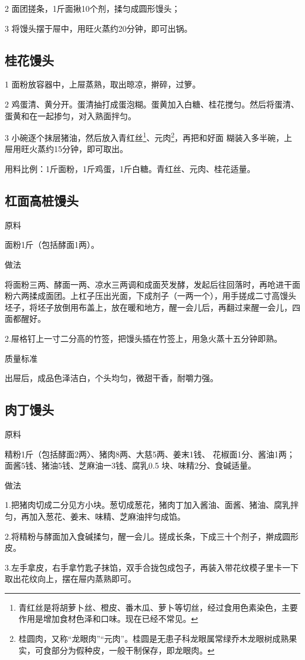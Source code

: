 \documentclass{ctexbook}
\begin{document}
2 面团搓条，1斤面揪10个剂，揉匀成圆形馒头；

3 将馒头摆于屉中，用旺火蒸约20分钟，即可出锅。
\subsection{桂花馒头}
1 面粉放容器中，上屉蒸熟，取出晾凉，擀碎，过箩。

2 鸡蛋清、黄分开。蛋清抽打成蛋泡糊。蛋黄加入白糖、桂花搅匀。然后将蛋清、蛋黄和在一起掺匀，对入熟面拌匀。

3 小碗逐个抹层猪油，然后放入青红丝\footnote{青红丝是将胡萝卜丝、橙皮、番木瓜、萝卜等切丝，经过食用色素染色，主要作用是增加食材色泽和口味。现在已经不常见。}、元肉\footnote{桂圆肉，又称“龙眼肉”“元肉”。桂圆是无患子科龙眼属常绿乔木龙眼树成熟果实，可食部分为假种皮，一般干制保存，即龙眼肉。}，再把和好面
糊装入多半碗，上屉用旺火蒸约15分钟，即可取出。

用料比例：1斤面粉，1斤鸡蛋，1斤白糖。青红丝、元肉、桂花适量。
\subsection{杠面高桩馒头}
原料

面粉1斤（包括酵面1两）。

做法

将面粉三两、酵面一两、凉水三两调和成面芡发酵，发起后往回落时，再呛进干面粉六两揉成面团。上杠子压出光面，下成剂子（一两一个），用手搓成二寸高馒头坯子，将坯子放倒用布盖上，放在暖和地方，醒一会儿后，再翻过来醒一会儿，四面都醒好。

2.屉格钉上一寸二分高的竹签，把馒头插在竹签上，用急火蒸十五分钟即熟。

质量标准

出屉后，成品色泽洁白，个头均匀，微甜干香，耐嚼力强。
\subsection{肉丁馒头}
原料

精粉1斤（包括酵面2两〉、猪肉8两、大慈5两、姜末1钱、 花椒面1分、酱油1两；面酱5钱、猪油5钱、芝麻油一3钱、腐乳0.5 块、味精2分、食碱适量。

做法

1.把猪肉切成二分见方小块。葱切成葱花，猪肉丁加入酱油、面酱、猪油、腐乳拌匀，再加入葱花、姜末、味精、芝麻油拌匀成馅。

2.将精粉与酵面加入食碱揉匀，醒一会儿。搓成长条，下成三十个剂子，擀成圆形皮。

3.左手拿皮，右手拿竹匙子抹馅，双手合拢包成包子，再装入带花纹模子里卡一下取出花纹向上，摆在屉内蒸熟即可。
\end{document}
